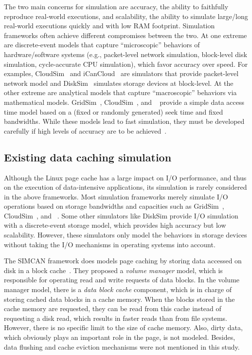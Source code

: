 The two main concerns for simulation are accuracy, the ability to 
faithfully reproduce real-world executions, and scalability, 
the ability to simulate large/long real-world executions quickly 
and with low RAM footprint. 
Simulation frameworks often achieve different compromises between the two.  
At one extreme are discrete-event models that capture
``microscopic'' behaviors of hardware/software systems (e.g.,
packet-level network simulation, block-level disk simulation,
cycle-accurate CPU simulation), which favor accuracy over speed.  
For examples, CloudSim~\cite{cloudsim} and 
iCanCloud~\cite{nunez2012icancloud} are simulators that provide 
packet-level network model and DiskSim~\cite{bucy2003disksim} simulates 
storage devices at block-level.  
At the other extreme are analytical models that capture
``macroscopic'' behaviors via mathematical models.  
GridSim~\cite{gridsim}, CloudSim~\cite{cloudsim}, and 
\simgrid~\cite{casanova2014simgrid} provide a simple data access time 
model based on a (fixed or randomly generated) seek time and 
fixed bandwidths. 
While these models lead to fast simulation, they must be developed
carefully if high levels of accuracy are to be achieved~\cite{velhoTOMACS2013}. 

\subsection{Existing data caching simulation}

Although the Linux page cache has a large impact on I/O performance, 
and thus on the execution of data-intensive applications, 
its simulation is rarely considered in the above frameworks.  
Most simulation frameworks merely simulate I/O operations based on 
storage bandwidths and capacities such as GridSim~\cite{gridsim}, 
CloudSim~\cite{cloudsim}, and \simgrid~\cite{casanova2014simgrid}. 
Some other simulators like DiskSim provide I/O simulation with 
a discrete-event storage model, which provides high accuracy 
but low scalability. However, these simulators only model 
the behaviors in storage devices without taking the I/O mechanisms 
in operating systems into account. 

The SIMCAN framework does models page caching by storing data 
accessed on disk in a block cache~\cite{nunez2012simcan}. 
They proposed a \textit{volume manager} model, which is responsible for 
operating read and write requests of data blocks. 
In the volume manager model, there is a \textit{data block cache} component, 
which is in charge of storing cached data blocks in a cache memory. 
When the blocks stored in the cache memory are requested, they can be 
read from this cache instead of requesting a disk read, which results in 
faster reads than from file systems.
However, there is no specific limit to the size of cache memory. 
Also, dirty data, which obviously plays an important role in the page,
is not modeled. 
Besides, data flushing and cache eviction mechanisms were not mentioned 
in this study. 

